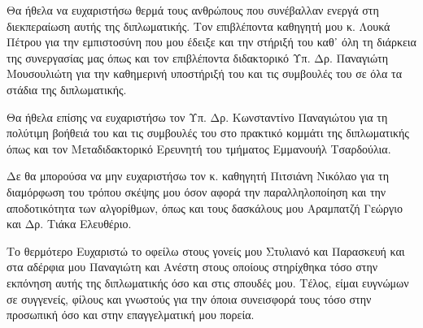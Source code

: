\begin{acknowledgements}
Θα ήθελα να ευχαριστήσω θερμά τους ανθρώπους που συνέβαλλαν ενεργά στη διεκπεραίωση αυτής της διπλωματικής. Τον επιβλέποντα καθηγητή μου κ. Λουκά Πέτρου για την εμπιστοσύνη που μου έδειξε και την στήριξή του καθ᾽ όλη τη διάρκεια της συνεργασίας μας όπως και τον επιβλέποντα διδακτορικό Υπ. Δρ. Παναγιώτη Μουσουλιώτη για την καθημερινή υποστήριξή του και τις συμβουλές του σε όλα τα στάδια της διπλωματικής. 

Θα ήθελα επίσης να ευχαριστήσω τον Υπ. Δρ. Κωνσταντίνο Παναγιώτου για τη πολύτιμη βοήθειά του και τις συμβουλές του στο πρακτικό κομμάτι της διπλωματικής όπως και τον Μεταδιδακτορικό Ερευνητή του τμήματος Εμμανουήλ Τσαρδούλια. 

Δε θα μπορούσα να μην ευχαριστήσω τον κ. καθηγητή Πιτσιάνη Νικόλαο για τη διαμόρφωση του τρόπου σκέψης μου όσον αφορά την παραλληλοποίηση και την αποδοτικότητα των αλγορίθμων, όπως και τους δασκάλους μου Αραμπατζή Γεώργιο και Δρ. Τιάκα Ελευθέριο.

Το θερμότερο Ευχαριστώ το οφείλω στους γονείς μου Στυλιανό και Παρασκευή και στα αδέρφια μου Παναγιώτη και Ανέστη στους οποίους στηρίχθηκα τόσο στην εκπόνηση αυτής της διπλωματικής όσο και στις σπουδές μου. Τέλος, είμαι ευγνώμων σε συγγενείς, φίλους και γνωστούς για την όποια συνεισφορά τους τόσο στην προσωπική όσο και στην επαγγελματική μου πορεία.

\end{acknowledgements}

